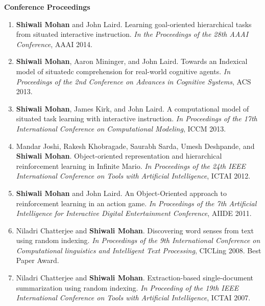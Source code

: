 \documentclass[margin,line,11pt]{res}
\begin{document}
\begin{resume}
                  \textbf{Conference Proceedings}
                  \begin{enumerate}[label=\lbrack C\arabic*\rbrack,leftmargin=*]
                  \item \textbf{Shiwali Mohan} and John Laird. Learning goal-oriented hierarchical tasks from situated interactive instruction. \emph{In the Proceedings of the 28th AAAI Conference}, AAAI 2014.
                  \item \textbf{Shiwali Mohan}, Aaron Mininger, and John Laird. Towards an Indexical model of situatedc comprehension for real-world cognitive agents. \emph{In Proceedings of the 2nd Conference on Advances in Cognitive Systems}, ACS 2013.
                  \item \textbf{Shiwali Mohan}, James Kirk, and John Laird. A computational model of situated task learning with interactive instruction. \emph{In Proceedings of the 17th International Conference on Computational Modeling}, ICCM 2013.
                  \item Mandar Joshi, Rakesh Khobragade, Saurabh Sarda, Umesh Deshpande, and \textbf{Shiwali Mohan}. Object-oriented
                    representation and hierarchical reinforcement learning in Infinite Mario. \emph{In Proceedings of the 24th IEEE
                      International Conference on Tools with Artificial Intelligence}, ICTAI 2012.
                  \item \textbf{Shiwali Mohan} and John Laird. An Object-Oriented approach to reinforcement learning in an action game.
                    \emph{In Proceedings of the 7th Artificial Intelligence for Interactive Digital Entertainment Conference}, AIIDE 2011.
                  \item Niladri Chatterjee and \textbf{Shiwali Mohan}. Discovering word senses from text using random indexing. \emph{In
                    Proceedings of the 9th International Conference on Computational linguistics and Intelligent Text Processing},
                    CICLing 2008. Best Paper Award.
                  \item Niladri Chatterjee and \textbf{Shiwali Mohan}. Extraction-based single-document summarization using random
                    indexing. \emph{In Proceeding of the 19th IEEE International Conference on Tools with Artificial Intelligence}, ICTAI
                    2007.
                  \end{enumerate}


\end{resume}
\end{document}
